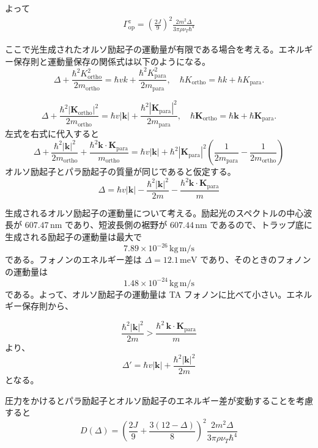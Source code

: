 よって
\begin{align}
\Gamma^{z}_{\mathrm{op}} = 
\left( \frac{2J}{9} \right)^2 
\frac{2m^2 \Delta}{3 \pi \rho \nu_T \hbar^4}
\end{align}


ここで光生成されたオルソ励起子の運動量が有限である場合を考える。エネルギー保存則と運動量保存の関係式は以下のようになる。
\begin{equation}
\Delta + \frac{\hbar^2 K^2_{\text{ortho}}}{2 m_{\text{ortho}}} = \hbar v k + \frac{\hbar^2 K^2_{\text{para}}}{2 m_{\text{para}}}, \quad
\hbar K_{\text{ortho}} = \hbar k + \hbar K_{\text{para}}.
\end{equation}


\begin{equation}
\Delta + \frac{\hbar^2 \left| \mathbf{K}_{\text{ortho}} \right|^2}{2 m_{\text{ortho}}} = \hbar v |\mathbf{k}| + \frac{\hbar^2 \left| \mathbf{K}_{\text{para}} \right|^2}{2 m_{\text{para}}},
\quad
\hbar \mathbf{K}_{\text{ortho}} = \hbar \mathbf{k} + \hbar \mathbf{K}_{\text{para}}.
\end{equation}
左式を右式に代入すると
\[
\Delta + \frac{\hbar^2 |\mathbf{k}|^2}{2 m_{\text{ortho}}} + \frac{\hbar^2 \mathbf{k} \cdot \mathbf{K}_{\text{para}}}{m_{\text{ortho}}} = \hbar v |\mathbf{k}| + \hbar^2 |\mathbf{K}_{\text{para}}|^2 \left( \frac{1}{2 m_{\text{para}}} - \frac{1}{2 m_{\text{ortho}}} \right)
\]
オルソ励起子とパラ励起子の質量が同じであると仮定する。
\[
\Delta = \hbar v |\mathbf{k}| - \frac{\hbar^2 |\mathbf{k}|^2}{2 m} - \frac{\hbar^2 \mathbf{k} \cdot \mathbf{K}_{\text{para}}}{m}
\]


生成されるオルソ励起子の運動量について考える。励起光のスペクトルの中心波長が \( 607.47 \, \mathrm{nm} \) であり、短波長側の裾野が \( 607.44 \, \mathrm{nm} \) であるので、トラップ底に生成される励起子の運動量は最大で 
\[
7.89 \times 10^{-26} \, \mathrm{kg \, m/s}
\] 
である。フォノンのエネルギー差は \( \Delta = 12.1 \, \mathrm{meV} \) であり、そのときのフォノンの運動量は 
\[
1.48 \times 10^{-24} \, \mathrm{kg \, m/s}
\] 
である。よって、オルソ励起子の運動量は TA フォノンに比べて小さい。エネルギー保存則から、



\[
\frac{\hbar^2 |\mathbf{k}|^2}{2 m} > \frac{\hbar^2 \, \mathbf{k} \cdot \mathbf{K}_{\text{para}}}{m}
\]
より、
\[
\Delta' = \hbar v |\mathbf{k}| + \frac{\hbar^2 |\mathbf{k}|^2}{2 m}
\]
となる。




圧力をかけるとパラ励起子とオルソ励起子のエネルギー差が変動することを考慮すると
\[
D(\Delta) = \left(\frac{2J}{9} + \frac{3(12 - \Delta)}{8} \right)^2 \frac{2m^2 \Delta}{3 \pi \rho \nu_T \hbar^4}
\]

